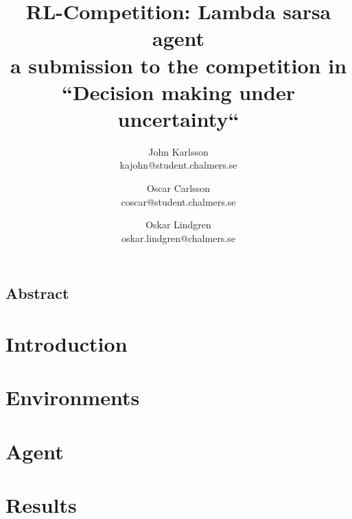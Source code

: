 \documentclass[letterpaper,twocolumn,10pt]{article}
\begin{document}
\date{}

\title{ RL-Competition: Lambda sarsa agent\\ \small a submission to the competition in ``Decision making under uncertainty``}

\author{
{\rm John Karlsson}\\
kajohn@student.chalmers.se
\and
{\rm Oscar Carlsson}\\
coscar@student.chalmers.se
\and
{\rm Oskar Lindgren}\\
oskar.lindgren@chalmers.se
}

\maketitle

\thispagestyle{empty}

\subsection*{Abstract}


\section{Introduction}


\section{Environments}


\section{Agent}


\section{Results}


{\footnotesize 
}

\theendnotes
\end{document}
